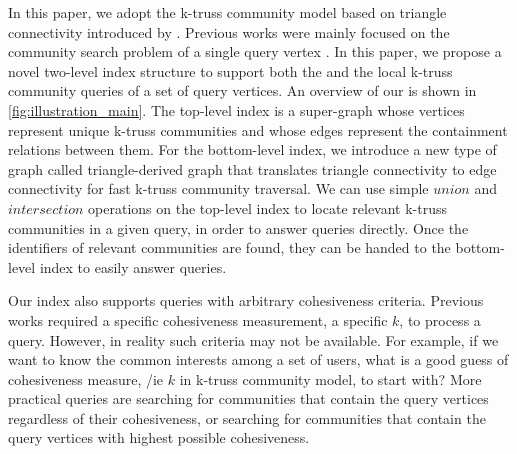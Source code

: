 In this paper, we adopt the k-truss community model based on triangle connectivity introduced by \cite{huang2014querying}.
Previous works were mainly focused on the community search problem of a single query vertex \cite{huang2014querying, akbas2017truss}. In this paper, we propose a novel two-level index structure to support both the \toplevelprob{} and the \bottomlevelprob{} local k-truss community queries of a set of query vertices. An overview of our \twolevelindex{} is shown in \autoref{fig:illustration_main}. The top-level index is a super-graph whose vertices represent unique k-truss communities and whose edges represent the containment relations between them. For the bottom-level index, we introduce a new type of graph called triangle-derived graph that translates triangle connectivity to edge connectivity for fast k-truss community traversal. We can use simple $union$ and $intersection$ operations on the top-level index to locate relevant k-truss communities in a given query, in order to answer \toplevelprob{} queries directly. Once the identifiers of relevant communities are found, they can be handed to the bottom-level index to easily answer \bottomlevelprob{} queries.

Our index also supports queries with arbitrary cohesiveness criteria. Previous works required a specific cohesiveness measurement, \eg a specific $k$, to process a query. However, in reality such criteria may not be available. For example, if we want to know the common interests among a set of users, what is a good guess of cohesiveness measure, /ie $k$ in k-truss community model, to start with? More practical queries are searching for communities that contain the query vertices regardless of their cohesiveness, or searching for communities that contain the query vertices with highest possible cohesiveness.


